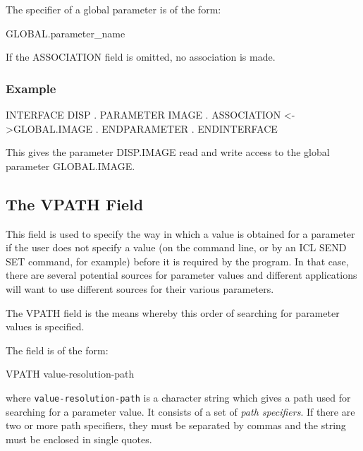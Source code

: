 \documentclass[twoside,11pt,nolof]{starlink}
\begin{document}
The specifier of a global parameter is of the form:
\begin{terminalv}
GLOBAL.parameter_name
\end{terminalv}
If the ASSOCIATION field is omitted, no association is made.

\subsubsection*{Example}
\begin{terminalv}
INTERFACE DISP
   .
   PARAMETER IMAGE
         .
      ASSOCIATION <->GLOBAL.IMAGE
         .
   ENDPARAMETER
      .
ENDINTERFACE
\end{terminalv}
This gives the parameter DISP.IMAGE read and write access to the global
parameter GLOBAL.\-IMAGE.

\subsection{The VPATH Field
\label{vpath}}

This field is used to specify the way in which a value is obtained for
a parameter if the user does not specify a value (on the command line, or by
an ICL SEND SET command, for example) before it is required by the program.
In that case, there are several potential sources for parameter values and
different applications will want to use different sources for their various
parameters.

The VPATH field is the means whereby this
order of searching for parameter values is specified.

The field is of the form:
\begin{terminalv}
VPATH  value-resolution-path
\end{terminalv}
where \texttt{value-resolution-path} is a character string which gives a path
used for searching for a parameter value.
It consists of a set of \emph{path specifiers}. If there are two or more
path specifiers, they must be separated by commas and the string must be
enclosed in single quotes.
\end{document}
